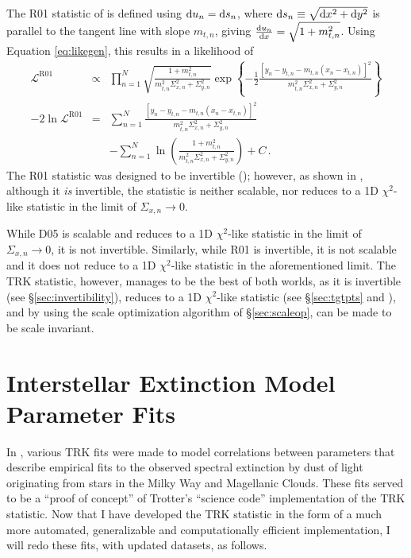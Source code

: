 The R01 statistic of \textcite{r01} is defined using $\mathop{}\!\mathrm{d} u_n = \mathop{}\!\mathrm{d} s_n$, where $\mathop{}\!\mathrm{d} s_n\equiv\sqrt{\mathop{}\!\mathrm{d} x^2+\mathop{}\!\mathrm{d} y^2}$ is parallel to the tangent line with slope $m_{t,n}$, giving $\dv{u_n}{x}=\sqrt{1+m_{t,n}^2}$. Using Equation \eqref{eq:likegen}, this results in a likelihood of
\begin{eqnarray}\label{eq:R01}
\mathcal{L}^{\mathrm {R01}} & \propto & \prod_{n=1}^{N}{\sqrt{\frac{1+m_{t,n}^2}{m_{t,n}^2\Sigma_{x,n}^2+\Sigma_{y,n}^2}}\exp{\left\{-\frac{1}{2}\frac{\left[y_n-y_{t,n}-m_{t,n}(x_n-x_{t,n})\right]^2}{m_{t,n}^2\Sigma_{x,n}^2+\Sigma_{y,n}^2}\right\}}} \nonumber \\
-2\ln\mathcal{L}^{\mathrm{R01}} & = & \sum_{n=1}^{N}{\frac{\left[y_n-y_{t,n}-m_{t,n}(x_n-x_{t,n})\right]^2}{m_{t,n}^2\Sigma_{x,n}^2+\Sigma_{y,n}^2}} \nonumber \\
& & - \sum_{n=1}^{N}{\ln\left(\frac{1+m_{t,n}^2}{m_{t,n}^2\Sigma_{x,n}^2+\Sigma_{y,n}^2}\right)} + C \, .
\end{eqnarray}
The R01 statistic was designed to be invertible (\textcite{r01}); however, as shown in \textcite{trotter}, although it \textit{is} invertible, the statistic is neither scalable, nor reduces to a 1D $\chi^2$-like statistic in the limit of $\Sigma_{x,n}\rightarrow 0$.


While D05 is scalable and reduces to a 1D $\chi^2$-like statistic in the limit of $\Sigma_{x,n}\rightarrow 0$, it is not invertible. Similarly, while R01 is invertible, it is not scalable and it does not reduce to a 1D $\chi^2$-like statistic in the aforementioned limit. The TRK statistic, however, manages to be the best of both worlds, as it is invertible (see \S\ref{sec:invertibility}), reduces to a 1D $\chi^2$-like statistic (see \S\ref{sec:tgtpts} and \textcite{trotter}), and by using the scale optimization algorithm of \S\ref{sec:scaleop}, can be made to be scale invariant.

\section{Interstellar Extinction Model Parameter Fits}
\label{sec:extincfits}
In \textcite{trotter}, various TRK fits were made to model correlations between parameters that describe empirical fits to the observed spectral extinction by dust of light originating from stars in the Milky Way and Magellanic Clouds. These fits served to be a ``proof of concept'' of Trotter's ``science code'' implementation of the TRK statistic. Now that I have developed the TRK statistic in the form of a much more automated, generalizable and computationally efficient implementation, I will redo these fits, with updated datasets, as follows.

